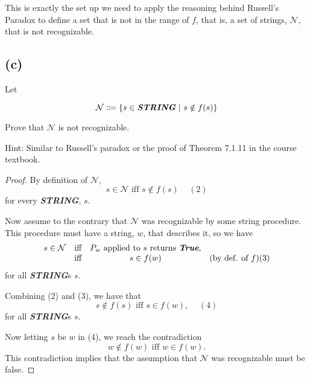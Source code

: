 \documentclass[14pt]{extarticle}
\newcommand{\str}[1]{\textit{\textbf{#1}}}
\begin{document}
This is exactly the set up we need to apply the reasoning behind Russell's Paradox to define a set that is not in the range of $f$, that is, a set of strings, $\mathcal{N}$, that is not recognizable.

\subsection{(c)}
Let 

$$
\mathcal{N} \Coloneqq \{s \in \str{STRING} \,\,|\,\, s \notin f(s)\}
$$

Prove that $\mathcal{N}$ is not recognizable.

Hint: Similar to Russell's paradox or the proof of Theorem 7.1.11 in the course textbook.
\begin{proof}
By definition of $\mathcal{N}$,
$$
s \in \mathcal{N} \text{ iff } s \notin f(s) \,\,\,\,\,\,\,(2)
$$
for every \str{STRING}, $s$.

Now assume to the contrary that $\mathcal{N}$ was recognizable by some string procedure. This procedure must have a string, $w$, that describes it, so we have
$$
\begin{array}{cccc}
s \in \mathcal{N} & \text{iff} & P_w \text{ applied to } s \text{ returns } \str{True}, & \\
& \text{iff} & s \in f(w) & \text{(by def. of $f$)(3)}
\end{array}
$$
for all \str{STRING}s $s$.

Combining (2) and (3), we have that
$$
s \notin f (s) \text{ iff } s\in f(w),\,\,\,\,\,\,\,(4)
$$
for all \str{STRING}s $s$.

Now letting $s$ be $w$ in (4), we reach the contradiction
$$
w \notin f(w) \text{ iff } w \in f(w).
$$
This contradiction implies that the assumption that $\mathcal{N}$ was recognizable must be false.
\end{proof}
\end{document}
